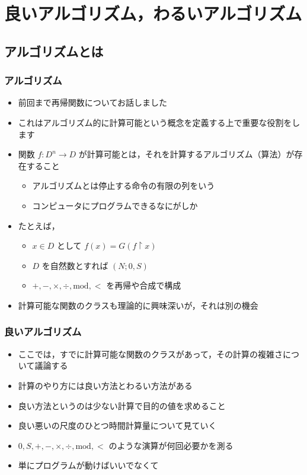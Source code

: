 \section{良いアルゴリズム，わるいアルゴリズム}
\subsection{アルゴリズムとは}
\begin{frame}
\frametitle{アルゴリズム}
  \begin{itemize}
\item 前回まで再帰関数についてお話しました
\item これはアルゴリズム的に計算可能という概念を定義する上で重要な役割をします
\item 関数 \(f:D^n\rightarrow D\) が計算可能とは，それを計算するアルゴリズム（算法）が存在すること
    \begin{itemize}
\item アルゴリズムとは停止する命令の有限の列をいう
\item コンピュータにプログラムできるなにがしか
    \end{itemize}
\item たとえば，
    \begin{itemize}
\item \(x\in D\) として \(f(x)=G(f\upharpoonright x)\)
\item $D$ を自然数とすれば \((N;0,S)\)
\item  \(+,-,\times,\div,\mathrm{mod},<\) を再帰や合成で構成
    \end{itemize}
\item 計算可能な関数のクラスも理論的に興味深いが，それは別の機会
  \end{itemize}
\end{frame}
\begin{frame}
\frametitle{良いアルゴリズム}
  \begin{itemize}
\item ここでは，すでに計算可能な関数のクラスがあって，その計算の複雑さについて議論する
\item 計算のやり方には良い方法とわるい方法がある
\item 良い方法というのは少ない計算で目的の値を求めること
\item 良い悪いの尺度のひとつ時間計算量について見ていく
\item \(0,S,+,-,\times,\div,\mathrm{mod},<\) のような演算が何回必要かを測る
\item 単にプログラムが動けばいいでなくて
  \end{itemize}
\end{frame}
